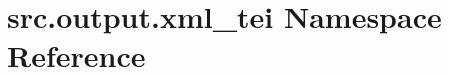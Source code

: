 \hypertarget{namespacesrc_1_1output_1_1xml__tei}{\section{src.\+output.\+xml\+\_\+tei Namespace Reference}
\label{namespacesrc_1_1output_1_1xml__tei}
}
